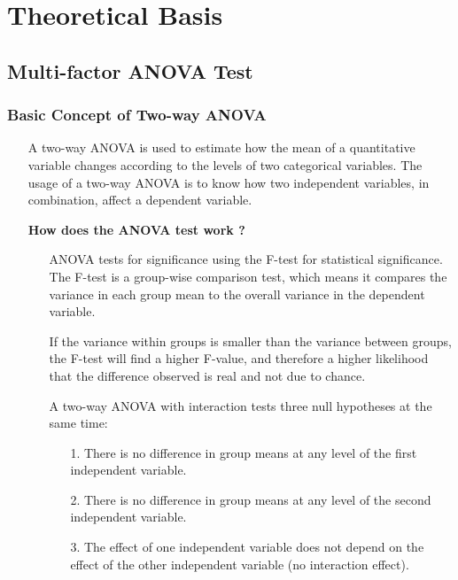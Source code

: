 \documentclass[a4paper]{article}
\begin{document}
\section{Theoretical Basis}

\subsection{Multi-factor ANOVA Test}

\subsubsection{Basic Concept of Two-way ANOVA}
\begin{itemize}
    \item[] A two-way ANOVA is used to estimate how the mean of a quantitative variable changes according to the levels of two categorical variables. The usage of a two-way ANOVA is to know how two independent variables, in combination, affect a dependent variable.
    
    \item[] \textbf{How does the ANOVA test work ?}
    \begin{itemize}
        \item[] ANOVA tests for significance using the F-test for statistical significance. The F-test is a group-wise comparison test, which means it compares the variance in each group mean to the overall variance in the dependent variable.
        
        \item[] If the variance within groups is smaller than the variance between groups, the F-test will find a higher F-value, and therefore a higher likelihood that the difference observed is real and not due to chance.
        
        \item[] A two-way ANOVA with interaction tests three null hypotheses at the same time:
        \begin{itemize}
            \item[1.] There is no difference in group means at any level of the first independent variable.
            \item[2.] There is no difference in group means at any level of the second independent variable.
            \item[3.] The effect of one independent variable does not depend on the effect of the other independent variable (no interaction effect).
        \end{itemize}
    \end{itemize}
    

\end{itemize}
\end{document}
